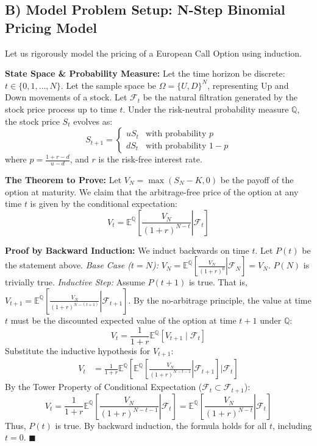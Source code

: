 \documentclass[11pt, a4paper]{article}
\theoremstyle{definition}
\theoremstyle{remark}
\newcommand{\Q}{\mathbb{Q}}
\newcommand{\E}{\mathbb{E}}
\newcommand{\F}{\mathcal{F}}
\begin{document}
\subsection{B) Model Problem Setup: N-Step Binomial Pricing Model}
Let us rigorously model the pricing of a European Call Option using induction. 

\textbf{State Space \& Probability Measure:}
Let the time horizon be discrete: $t \in \{0, 1, \dots, N\}$. 
Let the sample space be $\Omega = \{U, D\}^N$, representing Up and Down movements of a stock.
Let $\F_t$ be the natural filtration generated by the stock price process up to time $t$.
Under the risk-neutral probability measure $\Q$, the stock price $S_t$ evolves as:
\[
S_{t+1} = 
\begin{cases} 
u S_t & \text{with probability } p \\
d S_t & \text{with probability } 1-p 
\end{cases}
\]
where $p = \frac{1+r-d}{u-d}$, and $r$ is the risk-free interest rate.

\textbf{The Theorem to Prove:}
Let $V_N = \max(S_N - K, 0)$ be the payoff of the option at maturity. We claim that the arbitrage-free price of the option at any time $t$ is given by the conditional expectation:
\[
V_t = \E^\Q \left[ \left. \frac{V_N}{(1+r)^{N-t}} \right| \F_t \right]
\]

\textbf{Proof by Backward Induction:}
We induct backwards on time $t$. Let $P(t)$ be the statement above.
\textit{Base Case ($t=N$):} $V_N = \E^\Q \left[ \left. \frac{V_N}{(1+r)^0} \right| \F_N \right] = V_N$. $P(N)$ is trivially true.
\textit{Inductive Step:} Assume $P(t+1)$ is true. That is, $V_{t+1} = \E^\Q \left[ \left. \frac{V_N}{(1+r)^{N-(t+1)}} \right| \F_{t+1} \right]$.
By the no-arbitrage principle, the value at time $t$ must be the discounted expected value of the option at time $t+1$ under $\Q$:
\[
V_t = \frac{1}{1+r} \E^\Q \left[ V_{t+1} \mid \F_t \right]
\]
Substitute the inductive hypothesis for $V_{t+1}$:
\[
\begin{aligned}
V_t &= \frac{1}{1+r} \E^\Q \left[ \E^\Q \left[ \left. \frac{V_N}{(1+r)^{N-t-1}} \right| \F_{t+1} \right] \Bigg| \F_t \right]
\end{aligned}
\]
By the Tower Property of Conditional Expectation ($\F_t \subset \F_{t+1}$):
\[
V_t = \frac{1}{1+r} \E^\Q \left[ \left. \frac{V_N}{(1+r)^{N-t-1}} \right| \F_t \right] = \E^\Q \left[ \left. \frac{V_N}{(1+r)^{N-t}} \right| \F_t \right]
\]
Thus, $P(t)$ is true. By backward induction, the formula holds for all $t$, including $t=0$. \hfill $\blacksquare$
\end{document}
